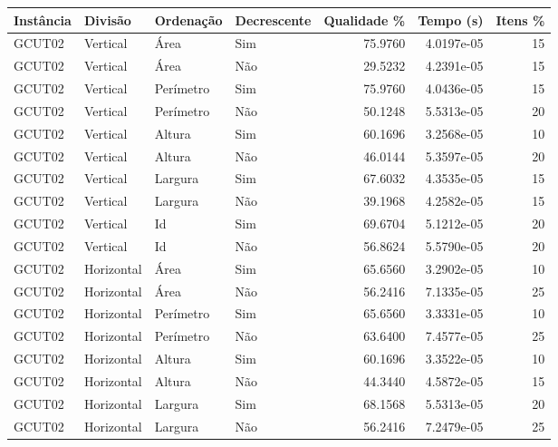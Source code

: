 \begin{tabular}{llllrrr}
    \hline
    Instância & Divisão     & Ordenação & Decrescente & Qualidade \% & Tempo (s)  & Itens \% \\
    \hline
    GCUT02    & Vertical    & Área      & Sim         & 75.9760      & 4.0197e-05 & 15       \\
    GCUT02    & Vertical    & Área      & Não         & 29.5232      & 4.2391e-05 & 15       \\
    GCUT02    & Vertical    & Perímetro & Sim         & 75.9760      & 4.0436e-05 & 15       \\
    GCUT02    & Vertical    & Perímetro & Não         & 50.1248      & 5.5313e-05 & 20       \\
    GCUT02    & Vertical    & Altura    & Sim         & 60.1696      & 3.2568e-05 & 10       \\
    GCUT02    & Vertical    & Altura    & Não         & 46.0144      & 5.3597e-05 & 20       \\
    GCUT02    & Vertical    & Largura   & Sim         & 67.6032      & 4.3535e-05 & 15       \\
    GCUT02    & Vertical    & Largura   & Não         & 39.1968      & 4.2582e-05 & 15       \\
    GCUT02    & Vertical    & Id        & Sim         & 69.6704      & 5.1212e-05 & 20       \\
    GCUT02    & Vertical    & Id        & Não         & 56.8624      & 5.5790e-05 & 20       \\
    GCUT02    & Horizontal  & Área      & Sim         & 65.6560      & 3.2902e-05 & 10       \\
    GCUT02    & Horizontal  & Área      & Não         & 56.2416      & 7.1335e-05 & 25       \\
    GCUT02    & Horizontal  & Perímetro & Sim         & 65.6560      & 3.3331e-05 & 10       \\
    GCUT02    & Horizontal  & Perímetro & Não         & 63.6400      & 7.4577e-05 & 25       \\
    GCUT02    & Horizontal  & Altura    & Sim         & 60.1696      & 3.3522e-05 & 10       \\
    GCUT02    & Horizontal  & Altura    & Não         & 44.3440      & 4.5872e-05 & 15       \\
    GCUT02    & Horizontal  & Largura   & Sim         & 68.1568      & 5.5313e-05 & 20       \\
    GCUT02    & Horizontal  & Largura   & Não         & 56.2416      & 7.2479e-05 & 25       \\

\end{tabular}
